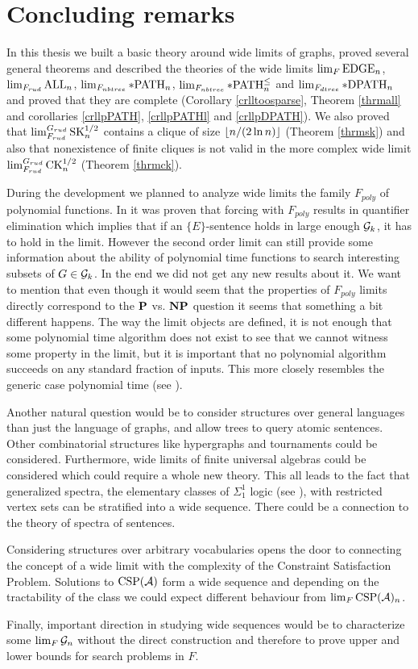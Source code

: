 \chapter*{Concluding remarks}

In this thesis we built a basic theory around wide limits of graphs, proved several general theorems and described the theories of the wide limits $\lim_F\EDGE_n$, $\lim_{F_{rud}}\ALL_n$, $\lim_{F_{nbtree}}\pPATH_n$, $\lim_{F_{nbtree}}\pPATHl_n$ and $\lim_{F_{dtree}}\pDPATH_n$ and proved that they are complete (Corollary \ref{crlltoosparse}, Theorem \ref{thrmall} and corollaries \ref{crllpPATH}, \ref{crllpPATHl} and \ref{crllpDPATH}).  We also proved that $\lim_{F_{rud}}^{G_{rud}}\SK_n^{1/2}$ contains a clique of size $\floor{n/(2\ln n)}$ (Theorem \ref{thrmsk}) and also that nonexistence of finite cliques is not valid in the more complex wide limit $\lim_{F_{rud}}^{G_{rud}}\CK_n^{1/2}$ (Theorem \ref{thrmck}).

During the development we planned to analyze wide limits the family $F_{poly}$ of polynomial functions. In \cite{krajicek2010forcing} it was proven that forcing with $F_{poly}$ results in quantifier elimination which implies that if an $\{E\}$-sentence holds in large enough $\G_k$, it has to hold in the limit. However the second order limit can still provide some information about the ability of polynomial time functions to search interesting subsets of $G\in\G_k$. In the end we did not get any new results about it. We want to mention that even though it would seem that the properties of $F_{poly}$ limits directly correspond to the $\P$ vs. $\NP$ question it seems that something a bit different happens. The way the limit objects are defined, it is not enough that some polynomial time algorithm does not exist to see that we cannot witness some property in the limit, but it is important that no polynomial algorithm succeeds on any standard fraction of inputs. This more closely resembles the generic case polynomial time (see \cite{gilman2007report}).

Another natural question would be to consider structures over general languages than just the language of graphs, and allow trees to query atomic sentences. Other combinatorial structures like hypergraphs and tournaments could be considered. Furthermore, wide limits of finite universal algebras could be considered which could require a whole new theory. This all leads to the fact that generalized spectra, the elementary classes of $\Sigma_1^1$ logic (see \cite{Fagin74}), with restricted vertex sets can be stratified into a wide sequence. There could be a connection to the theory of spectra of sentences.


Considering structures over arbitrary vocabularies opens the door to connecting the concept of a wide limit with the complexity of the Constraint Satisfaction Problem. Solutions to $\text{CSP}(\A)$ form a wide sequence and depending on the tractability of the class we could expect different behaviour from $\lim_{F}\text{CSP}(\A)_n$.

Finally, important direction in studying wide sequences would be to characterize some $\lim_F\G_n$ without the direct construction and therefore to prove upper and lower bounds for search problems in $F$.
